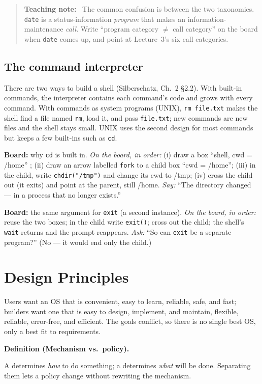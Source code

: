 \documentclass[11pt]{article}
\newenvironment{definitionbox}[1]{%
  \par\noindent\textbf{Definition (#1).}\ \itshape
}{\par\vspace{0.3em}}
\newenvironment{teachingaside}{\begin{quote}\small\color{primary-gold}\textbf{Teaching note:}\ }{\end{quote}}
\begin{document}
\begin{teachingaside}
The common confusion is between the two taxonomies. \texttt{date} is a status-information \emph{program} that makes an information-maintenance \emph{call}. Write ``program category $\neq$ call category'' on the board when \texttt{date} comes up, and point at Lecture~3's six call categories.
\end{teachingaside}

\subsection*{The command interpreter}

There are two ways to build a shell (Silberschatz, Ch.~2 \S2.2). With built-in commands, the interpreter contains each command's code and grows with every command. With commands as system programs (UNIX), \texttt{rm file.txt} makes the shell find a file named \texttt{rm}, load it, and pass \texttt{file.txt}; new commands are new files and the shell stays small. UNIX uses the second design for most commands but keeps a few built-ins such as \texttt{cd}.

\textbf{Board:} why \texttt{cd} is built in. \emph{On the board, in order:} (i) draw a box ``shell, cwd = /home'' ; (ii) draw an arrow labelled \texttt{fork} to a child box ``cwd = /home''; (iii) in the child, write \texttt{chdir("/tmp")} and change its cwd to /tmp; (iv) cross the child out (it exits) and point at the parent, still /home. \emph{Say:} ``The directory changed --- in a process that no longer exists.''

\textbf{Board:} the same argument for \texttt{exit} (a second instance). \emph{On the board, in order:} reuse the two boxes; in the child write \texttt{exit()}; cross out the child; the shell's \texttt{wait} returns and the prompt reappears. \emph{Ask:} ``So can \texttt{exit} be a separate program?'' (No --- it would end only the child.)

\section{Design Principles}

Users want an OS that is convenient, easy to learn, reliable, safe, and fast; builders want one that is easy to design, implement, and maintain, flexible, reliable, error-free, and efficient. The goals conflict, so there is no single best OS, only a best fit to requirements.

\begin{definitionbox}{Mechanism vs.\ policy}
A  determines \emph{how} to do something; a  determines \emph{what} will be done. Separating them lets a policy change without rewriting the mechanism.
\end{definitionbox}
\end{document}
